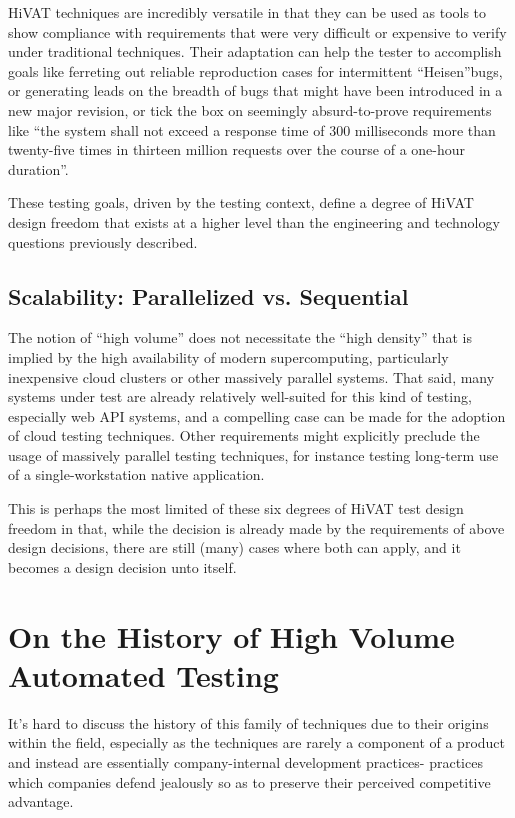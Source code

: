HiVAT techniques are incredibly versatile in that they can be used as tools to show compliance with requirements that were very difficult or expensive to verify under traditional techniques. Their adaptation can help the tester to accomplish goals like ferreting out reliable reproduction cases for intermittent ``Heisen''bugs, or generating leads on the breadth of bugs that might have been introduced in a new major revision, or tick the box on seemingly absurd-to-prove requirements like ``the system shall not exceed a response time of 300 milliseconds more than twenty-five times in thirteen million requests over the course of a one-hour duration''.

These testing goals, driven by the testing context, define a degree of HiVAT design freedom that exists at a higher level than the engineering and technology questions previously described.

\subsection{Scalability: Parallelized vs. Sequential}
The notion of ``high volume'' does not necessitate the ``high density'' that is implied by the high availability of modern supercomputing, particularly inexpensive cloud clusters or other massively parallel systems. That said, many systems under test are already relatively well-suited for this kind of testing, especially web API systems, and a compelling case can be made for the adoption of cloud testing techniques.\citep{parveen2010migrate} Other requirements might explicitly preclude the usage of massively parallel testing techniques, for instance testing long-term use of a single-workstation native application.

This is perhaps the most limited of these six degrees of HiVAT test design freedom in that, while the decision is already made by the requirements of above design decisions, there are still (many) cases where both can apply, and it becomes a design decision unto itself.

\section{On the History of High Volume Automated Testing}
It's hard to discuss the history of this family of techniques due to their origins within the field, especially as the techniques are rarely a component of a product and instead are essentially company-internal development practices- practices which companies defend jealously so as to preserve their perceived competitive advantage.


